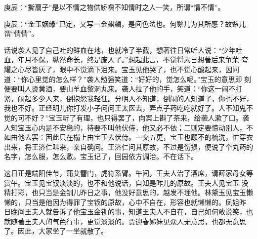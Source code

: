 \begin{parag}

    \begin{note}庚辰：“撕扇子”是以不情之物供娇嗔不知情时之人一笑，所谓“情不情”。\end{note}
\end{parag}


\begin{parag}


    \begin{note}庚辰：“金玉姻缘”已定，又写一金麒麟，是间色法也。何颦儿为其所感？故颦儿谓“情情”。\end{note}
\end{parag}

\begin{parag}

    话说袭人见了自己吐的鲜血在地，也就冷了半截，想著往日常听人说：“少年吐血，年月不保，纵然命长，终是废人了。”想起此言，不觉将素日想著后来争荣 夸耀之心尽皆灰了，眼中不觉滴下泪来。宝玉见他哭了，也不觉心酸起来，因问道：“你心里觉的怎么样？”袭人勉强笑道：“好好的，觉怎么呢。”宝玉的意思即 刻便要叫人烫黄酒，要山羊血黎洞丸来。袭人拉了他的手，笑道：“你这一闹不打紧，闹起多少人来，倒抱怨我轻狂。分明人不知道，倒闹的人知道了，你也不好， 我也不好。正经明儿你打发小子问问王太医去，弄点子药吃吃就好了。人不知鬼不觉的可不好？”宝玉听了有理，也只得罢了，向案上斟了茶来，给袭人漱了口。袭人知宝玉心内是不安稳的，待要不叫他伏侍，他又必不依；二则定要惊动别人，不如由他去罢：因此只在榻上由宝玉去伏侍。一交五更，宝玉也顾不的梳洗，忙穿衣 出来，将王济仁叫来，亲自确问。王济仁问其原故，不过是伤损，便说了个丸药的名字，怎么服，怎么敷。宝玉记了，回园依方调治。不在话下。
\end{parag}


\begin{parag}


    这日正是端阳佳节，蒲艾簪门，虎符系臂。午间，王夫人治了酒席，请薛家母女等赏午。宝玉见宝钗淡淡的，也不和他说话，自知是昨儿的原故。王夫人见宝玉 没精打彩，也只当是金钏儿昨日之事，他没好意思的，越发不理他。林黛玉见宝玉懒懒的，只当是他因为得罪了宝钗的原故，心中不自在，形容也就懒懒的。凤姐昨 日晚间王夫人就告诉了他宝玉金钏的事，知道王夫人不自在，自己如何敢说笑，也就随著王夫人的气色行事，更觉淡淡的。贾迎春姊妹见众人无意思，也都无意思了。因此，大家坐了一坐就散了。
\end{parag}


